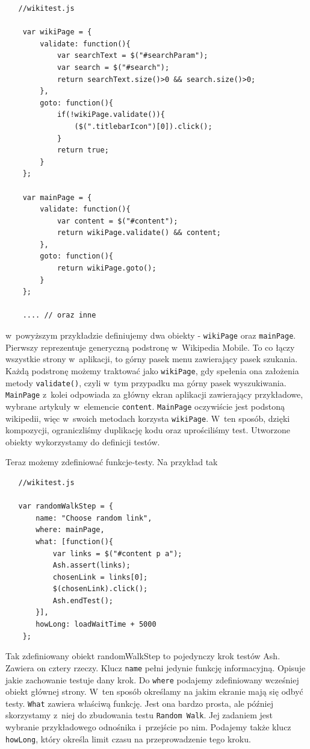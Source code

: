 \documentclass[brudnopis]{xmgr}
\begin{document}
\begin{lstlisting}
   //wikitest.js

    var wikiPage = {
        validate: function(){
            var searchText = $("#searchParam");
            var search = $("#search");
            return searchText.size()>0 && search.size()>0;
        },
        goto: function(){
            if(!wikiPage.validate()){
                ($(".titlebarIcon")[0]).click();
            }
            return true;
        }
    };
    
    var mainPage = {
        validate: function(){
            var content = $("#content");
            return wikiPage.validate() && content;
        },
        goto: function(){
            return wikiPage.goto();
        }
    };

    .... // oraz inne
\end{lstlisting}

w~powyższym przykładzie definiujemy dwa obiekty - \texttt{wikiPage} oraz \texttt{mainPage}. Pierwszy reprezentuje generyczną podstronę w~Wikipedia Mobile. To co łączy wszystkie strony w~aplikacji, to górny pasek menu zawierający pasek szukania. Każdą podstronę możemy traktować jako \texttt{wikiPage}, gdy spełenia ona założenia metody \texttt{validate()}, czyli w~tym przypadku ma górny pasek wyszukiwania. \texttt{MainPage} z~kolei odpowiada za główny ekran aplikacji zawierający przykładowe, wybrane artykuły w~elemencie \texttt{content}. \texttt{MainPage} oczywiście jest podstoną wikipedii, więc w~swoich metodach korzysta \texttt{wikiPage}. W~ten sposób, dzięki kompozycji, ograniczliśmy duplikację kodu oraz uprościliśmy test. Utworzone obiekty wykorzystamy do definicji testów.

Teraz możemy zdefiniować funkcje-testy. Na przykład tak

\begin{lstlisting}
   //wikitest.js

   var randomWalkStep = {
       name: "Choose random link",
       where: mainPage,
       what: [function(){
           var links = $("#content p a");
           Ash.assert(links);
           chosenLink = links[0];
           $(chosenLink).click();
           Ash.endTest();
       }],
       howLong: loadWaitTime + 5000
    };
\end{lstlisting}

Tak zdefiniowany obiekt randomWalkStep to pojedynczy krok testów Ash. Zawiera on cztery rzeczy. Klucz \texttt{name} pełni jedynie funkcję informacyjną. Opisuje jakie zachowanie testuje dany krok. Do \texttt{where} podajemy zdefiniowany wcześniej obiekt głównej strony. W~ten sposób określamy na jakim ekranie mają się odbyć testy. \texttt{What} zawiera właściwą funkcję. Jest ona bardzo prosta, ale później skorzystamy z~niej do zbudowania testu \texttt{Random Walk}. Jej zadaniem jest wybranie przykładowego odnośnika i~przejście po nim. Podajemy także klucz \texttt{howLong}, który określa limit czasu na przeprowadzenie tego kroku.
\end{document}
